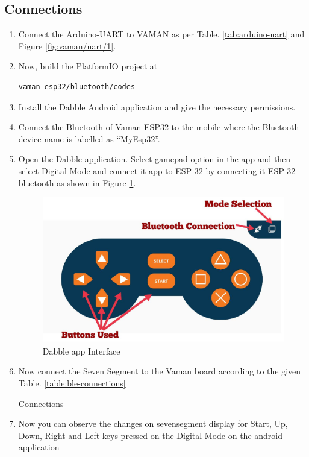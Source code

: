 \subsection{Connections}
\begin{enumerate}[label=\thesection.\arabic*.,ref=\thesection.\theenumi]
\item Connect the Arduino-UART to VAMAN as per Table. \ref{tab:arduino-uart} and Figure \ref{fig:vaman/uart/1}.
\item Now, build the PlatformIO project at
\begin{lstlisting}
vaman-esp32/bluetooth/codes
\end{lstlisting}
\item Install the Dabble Android application and give the necessary permissions.
\item Connect the Bluetooth of Vaman-ESP32 to the mobile where the Bluetooth 
device name is labelled as ``MyEsp32''.
\item Open the Dabble application. Select gamepad option in the app and then select Digital Mode and connect it app to ESP-32 by connecting it ESP-32 bluetooth as shown in Figure \ref{fig:ble_app}.
\begin{figure}[!ht]
\centering
\includegraphics[width=\columnwidth]{vaman-esp32/bluetooth/figs/ble_app.jpg}
\caption{Dabble app Interface}
\label{fig:ble_app}
\end{figure}
\item Now connect the Seven Segment to the Vaman board according to the given Table. \ref{table:ble-connections}
\begin{table}[!ht]
\centering

\caption{Connections}
\label{table:ble-connections}
\end{table}
\item Now you can observe the changes on sevensegment display for Start, Up, Down, Right and Left keys pressed on the Digital Mode on the android application
\end{enumerate}
